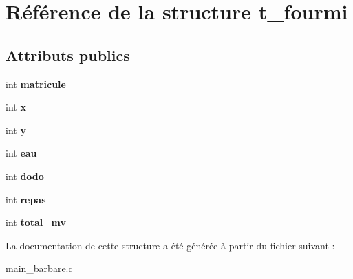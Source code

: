 \hypertarget{structt__fourmi}{\section{Référence de la structure t\+\_\+fourmi}
\label{structt__fourmi}
}
\subsection*{Attributs publics}
\begin{DoxyCompactItemize}
\item 
\hypertarget{structt__fourmi_ab45e723a7a11d7789888a5ee574c6bc9}{int {\bfseries matricule}}\label{structt__fourmi_ab45e723a7a11d7789888a5ee574c6bc9}

\item 
\hypertarget{structt__fourmi_a258cf4f2243aad27ab01dc55bb701078}{int {\bfseries x}}\label{structt__fourmi_a258cf4f2243aad27ab01dc55bb701078}

\item 
\hypertarget{structt__fourmi_aa9fe73b8d3d492ce6cf3985e4910fdf2}{int {\bfseries y}}\label{structt__fourmi_aa9fe73b8d3d492ce6cf3985e4910fdf2}

\item 
\hypertarget{structt__fourmi_a757c3ee4ea2dcbf825cd93f6b8bf0ef8}{int {\bfseries eau}}\label{structt__fourmi_a757c3ee4ea2dcbf825cd93f6b8bf0ef8}

\item 
\hypertarget{structt__fourmi_a0a2a75c5a649f263d4e299a488edfe4f}{int {\bfseries dodo}}\label{structt__fourmi_a0a2a75c5a649f263d4e299a488edfe4f}

\item 
\hypertarget{structt__fourmi_a5ba7caca7f8cf1e8195ceae92cdaca00}{int {\bfseries repas}}\label{structt__fourmi_a5ba7caca7f8cf1e8195ceae92cdaca00}

\item 
\hypertarget{structt__fourmi_a81345593813fffd4760b20bc55392190}{int {\bfseries total\+\_\+mv}}\label{structt__fourmi_a81345593813fffd4760b20bc55392190}

\end{DoxyCompactItemize}


La documentation de cette structure a été générée à partir du fichier suivant \+:\begin{DoxyCompactItemize}
\item 
main\+\_\+barbare.\+c\end{DoxyCompactItemize}
